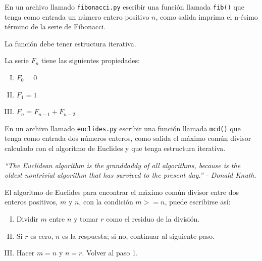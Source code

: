 \documentclass[11pt,letterpaper]{exam}
\begin{document}
\begin{questions}

 En un archivo llamado \verb"fibonacci.py" 
escribir una función llamada \verb"fib()" que tenga como entrada un número entero 
positivo $n$, como salida imprima el n-\'esimo t\'ermino de la serie de Fibonacci.

La función debe tener estructura iterativa.

\medskip
La serie $F_n$ tiene las siguientes propiedades:
\begin{enumerate}[I.)]
	\item $F_0 = 0$
	\item $F_1 = 1$
	\item $F_n = F_{n-1} +F_{n-2}$
\end{enumerate}

En un archivo llamado \verb"euclides.py"  escribir una función llamada \verb"mcd()"
que tenga como entrada dos números enteros, como salida el máximo común divisor
calculado con el algoritmo de Euclides y que tenga estructura iterativa.

\medskip
\textit{``The Euclidean algorithm is the granddaddy of all algorithms, because is
the oldest nontrivial algorithm that has survived to the present day.'' - Donald
Knuth}.
\medskip

El algoritmo de Euclides para encontrar el máximo común divisor entre dos 
enteros positivos, $m$ y $n$, con la condición $m>=n$, puede escribirse así:

\begin{enumerate}[I.)]
	\item Dividir $m$ entre $n$ y tomar $r$ como el residuo de la división.

	\item Si $r$ es cero, $n$ es la respuesta; si no, continuar al siguiente paso.

	\item Hacer $m=n$ y $n=r$. Volver al paso 1.
\end{enumerate}

\end{questions}
\end{document}
